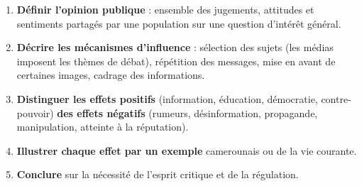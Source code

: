 \documentclass[11pt]{article}
\begin{document}
\begin{methode}
\begin{enumerate}
\item \textbf{Définir l'opinion publique} : ensemble des jugements, attitudes et sentiments partagés par une population sur une question d'intérêt général.
\item \textbf{Décrire les mécanismes d'influence} : sélection des sujets (les médias imposent les thèmes de débat), répétition des messages, mise en avant de certaines images, cadrage des informations.
\item \textbf{Distinguer les effets positifs} (information, éducation, démocratie, contre-pouvoir) \textbf{des effets négatifs} (rumeurs, désinformation, propagande, manipulation, atteinte à la réputation).
\item \textbf{Illustrer chaque effet par un exemple} camerounais ou de la vie courante.
\item \textbf{Conclure} sur la nécessité de l'esprit critique et de la régulation.
\end{enumerate}
\end{methode}
\end{document}

